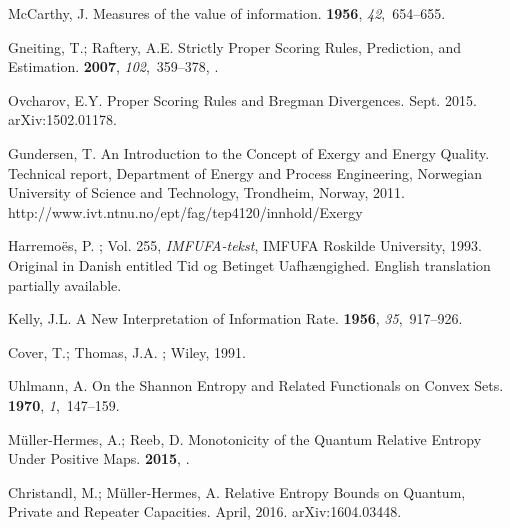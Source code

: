 \documentclass[10pt,a4paper,draft]{article}
\begin{document}
\begin{thebibliography}{-------}
{McC}arthy, J.
\newblock Measures of the value of information.
 {\bf 1956}, {\em 42},~654--655.

Gneiting, T.; Raftery, A.E.
\newblock Strictly Proper Scoring Rules, Prediction, and Estimation.
 {\bf 2007},
  {\em 102},~359--378,
  \href{http://xxx.lanl.gov/abs/http://dx.doi.org/10.1198/016214506000001437}{{}}.

Ovcharov, E.Y.
\newblock Proper Scoring Rules and Bregman Divergences.
\newblock Sept. 2015. arXiv:1502.01178.

Gundersen, T.
\newblock An Introduction to the Concept of Exergy and Energy Quality.
\newblock Technical report, Department of Energy and Process Engineering,
  Norwegian University of Science and Technology, Trondheim, Norway,  2011.
\newblock
  http://www.ivt.ntnu.no/ept/fag/tep4120/innhold/Exergy%

Harremo{\"e}s, P.
; Vol. 255, {\em
  IMFUFA-tekst}, IMFUFA Roskilde University,  1993.
\newblock Original in Danish entitled Tid og Betinget Uafh{\ae}ngighed. English
  translation partially available.

Kelly, J.L.
\newblock A New Interpretation of Information Rate.
 {\bf 1956}, {\em 35},~917--926.

Cover, T.; Thomas, J.A.
; Wiley,  1991.

Uhlmann, A.
\newblock On the {S}hannon Entropy and Related Functionals on Convex Sets.
 {\bf 1970}, {\em 1},~147--159.

M{\"u}ller-Hermes, A.; Reeb, D.
\newblock Monotonicity of the Quantum Relative Entropy Under Positive Maps.
 {\bf 2015},
  \href{http://xxx.lanl.gov/abs/Sept. 2016. arXiv:1512.06117v2}{{}}.

Christandl, M.; M{\"u}ller-Hermes, A.
\newblock Relative Entropy Bounds on Quantum, Private and Repeater Capacities.
\newblock April, 2016. arXiv:1604.03448.


\end{thebibliography}
\end{document}
